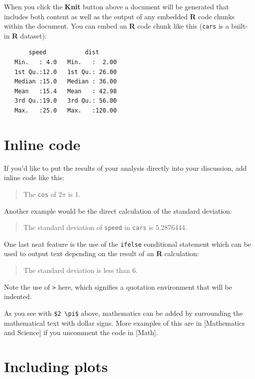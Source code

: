\documentclass[12pt,msc,a4paper,twoside]{ucl_thesis}
\begin{document}
  When you click the \textbf{Knit} button above a document will be generated that includes both content as well as the output of any embedded \textbf{R} code chunks within the document. You can embed an \textbf{R} code chunk like this (\texttt{cars} is a built-in \textbf{R} dataset):
  \begin{Shaded}
  \begin{Highlighting}[]
  \end{Highlighting}
  \end{Shaded}
  \begin{verbatim}
       speed           dist       
   Min.   : 4.0   Min.   :  2.00  
   1st Qu.:12.0   1st Qu.: 26.00  
   Median :15.0   Median : 36.00  
   Mean   :15.4   Mean   : 42.98  
   3rd Qu.:19.0   3rd Qu.: 56.00  
   Max.   :25.0   Max.   :120.00  
  \end{verbatim}
  \hypertarget{inline-code}{%
  \section{Inline code}\label{inline-code}}
  
  If you'd like to put the results of your analysis directly into your discussion, add inline code like this:
  \begin{quote}
  The \texttt{cos} of \(2 \pi\) is 1.
  \end{quote}
  Another example would be the direct calculation of the standard deviation:
  \begin{quote}
  The standard deviation of \texttt{speed} in \texttt{cars} is 5.2876444.
  \end{quote}
  One last neat feature is the use of the \texttt{ifelse} conditional statement which can be used to output text depending on the result of an \textbf{R} calculation:
  \begin{quote}
  The standard deviation is less than 6.
  \end{quote}
  Note the use of \texttt{\textgreater{}} here, which signifies a quotation environment that will be indented.
  
  As you see with \texttt{\$2\ \textbackslash{}pi\$} above, mathematics can be added by surrounding the mathematical text with dollar signs. More examples of this are in {[}Mathematics and Science{]} if you uncomment the code in {[}Math{]}.
  
  \hypertarget{including-plots}{%
  \section{Including plots}\label{including-plots}}
  
\end{document}
